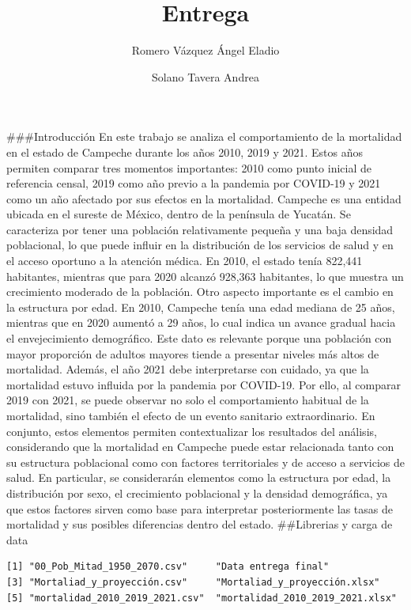 \documentclass[
  letterpaper,
  DIV=11,
  numbers=noendperiod]{scrartcl}
\title{Entrega}
\author{Romero Vázquez Ángel Eladio \and Solano Tavera Andrea}
\date{}
\begin{document}
\maketitle


\#\#\#Introducción En este trabajo se analiza el comportamiento de la
mortalidad en el estado de Campeche durante los años 2010, 2019 y 2021.
Estos años permiten comparar tres momentos importantes: 2010 como punto
inicial de referencia censal, 2019 como año previo a la pandemia por
COVID-19 y 2021 como un año afectado por sus efectos en la mortalidad.
Campeche es una entidad ubicada en el sureste de México, dentro de la
península de Yucatán. Se caracteriza por tener una población
relativamente pequeña y una baja densidad poblacional, lo que puede
influir en la distribución de los servicios de salud y en el acceso
oportuno a la atención médica. En 2010, el estado tenía 822,441
habitantes, mientras que para 2020 alcanzó 928,363 habitantes, lo que
muestra un crecimiento moderado de la población. Otro aspecto importante
es el cambio en la estructura por edad. En 2010, Campeche tenía una edad
mediana de 25 años, mientras que en 2020 aumentó a 29 años, lo cual
indica un avance gradual hacia el envejecimiento demográfico. Este dato
es relevante porque una población con mayor proporción de adultos
mayores tiende a presentar niveles más altos de mortalidad. Además, el
año 2021 debe interpretarse con cuidado, ya que la mortalidad estuvo
influida por la pandemia por COVID-19. Por ello, al comparar 2019 con
2021, se puede observar no solo el comportamiento habitual de la
mortalidad, sino también el efecto de un evento sanitario
extraordinario. En conjunto, estos elementos permiten contextualizar los
resultados del análisis, considerando que la mortalidad en Campeche
puede estar relacionada tanto con su estructura poblacional como con
factores territoriales y de acceso a servicios de salud. En particular,
se considerarán elementos como la estructura por edad, la distribución
por sexo, el crecimiento poblacional y la densidad demográfica, ya que
estos factores sirven como base para interpretar posteriormente las
tasas de mortalidad y sus posibles diferencias dentro del estado.
\#\#Librerias y carga de data

\begin{verbatim}
[1] "00_Pob_Mitad_1950_2070.csv"     "Data entrega final"            
[3] "Mortaliad_y_proyección.csv"     "Mortaliad_y_proyección.xlsx"   
[5] "mortalidad_2010_2019_2021.csv"  "mortalidad_2010_2019_2021.xlsx"
\end{verbatim}
\end{document}
